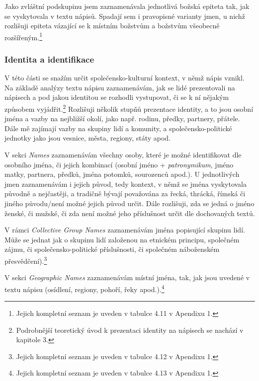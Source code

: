   \startitemize[a]
  \item
    \startblockquote
    Jako zvláštní podskupinu jsem zaznamenávala jednotlivá božská epiteta tak, jak se vyskytovala v textu nápisů. Spadají sem i pravopisné varianty jmen, u nichž rozlišuji epiteta vázající se k místním božstvům a božstvům všeobecně rozšířeným.\footnote{Jejich kompletní seznam je uveden v tabulce 4.11 v Apendixu 1.}
    \stopblockquote
  \stopitemize
\stopitemize

\subsubsection[identita-a-identifikace]{Identita a identifikace}

V této části se snažím určit společensko-kulturní kontext, v němž nápis vznikl. Na základě analýzy textu nápisu zaznamenávám, jak se lidé prezentovali na nápisech a pod jakou identitou se rozhodli vystupovat, či se k ní nějakým způsobem vyjádřit.\footnote{Podrobnější teoretický úvod k prezentaci identity na nápisech se nachází v kapitole 3.} Rozlišuji několik stupňů prezentace identity, a to jsou osobní jména a vazby na nejbližší okolí, jako např. rodinu, předky, partnery, přátele. Dále mě zajímají vazby na skupiny lidí a komunity, a společensko-politické jednotky jako jsou vesnice, města, regiony, státy apod.

\startitemize
\item
  \startblockquote
  V sekci {\em Names} zaznamenávám všechny osoby, které je možné identifikovat dle osobního jména, či jejich kombinací (osobní jméno + {\em patronymikum}, jméno matky, partnera, předků, jména potomků, sourozenců apod.). U jednotlivých jmen zaznamenávám i jejich původ, tedy kontext, v němž se jména vyskytovala původně a nejčastěji, a tradičně bývají považována za řecká, thrácká, římská či jiného původu/není možné jejich původ určit. Dále rozlišuji, zda se jedná o jméno ženské, či mužské, či zda není možné jeho příslušnost určit dle dochovaných textů.
  \stopblockquote
\item
  \startblockquote
  V rámci {\em Collective Group Names} zaznamenávám jména popisující skupinu lidí. Může se jednat jak o skupinu lidí založenou na etnickém principu, společném zájmu, či společensko-politické příslušnosti, či společném náboženském přesvědčení).\footnote{Jejich kompletní seznam je uveden v tabulce 4.12 v Apendixu 1.}
  \stopblockquote
\item
  \startblockquote
  V sekci {\em Geographic Names} zaznamenávám místní jména, tak, jak jsou uvedené v textu nápisu (osídlení, regiony, pohoří, řeky apod.).\footnote{Jejich kompletní seznam je uveden v tabulce 4.13 v Apendixu 1.}
  \stopblockquote
\stopitemize

